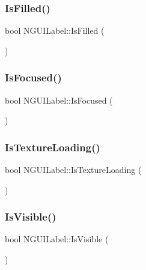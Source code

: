 \hypertarget{class_n_g_u_i_label_aa345615e896885d848026c369a5c7b4f}{}\label{class_n_g_u_i_label_aa345615e896885d848026c369a5c7b4f} 
\subsubsection{\texorpdfstring{Is\+Filled()}{IsFilled()}}
{\footnotesize\ttfamily bool N\+G\+U\+I\+Label\+::\+Is\+Filled (\begin{DoxyParamCaption}{ }\end{DoxyParamCaption})}

\hypertarget{class_n_g_u_i_label_a3302aab947fdeee8511498f42bb71449}{}\label{class_n_g_u_i_label_a3302aab947fdeee8511498f42bb71449} 
\subsubsection{\texorpdfstring{Is\+Focused()}{IsFocused()}}
{\footnotesize\ttfamily bool N\+G\+U\+I\+Label\+::\+Is\+Focused (\begin{DoxyParamCaption}{ }\end{DoxyParamCaption})}

\hypertarget{class_n_g_u_i_label_ad2326d5fdd87a36c550b4a56179ddc06}{}\label{class_n_g_u_i_label_ad2326d5fdd87a36c550b4a56179ddc06} 
\subsubsection{\texorpdfstring{Is\+Texture\+Loading()}{IsTextureLoading()}}
{\footnotesize\ttfamily bool N\+G\+U\+I\+Label\+::\+Is\+Texture\+Loading (\begin{DoxyParamCaption}{ }\end{DoxyParamCaption})}

\hypertarget{class_n_g_u_i_label_ad627b39f30bbd4bcea6f8bc33cf562cb}{}\label{class_n_g_u_i_label_ad627b39f30bbd4bcea6f8bc33cf562cb} 
\subsubsection{\texorpdfstring{Is\+Visible()}{IsVisible()}}
{\footnotesize\ttfamily bool N\+G\+U\+I\+Label\+::\+Is\+Visible (\begin{DoxyParamCaption}{ }\end{DoxyParamCaption})}

